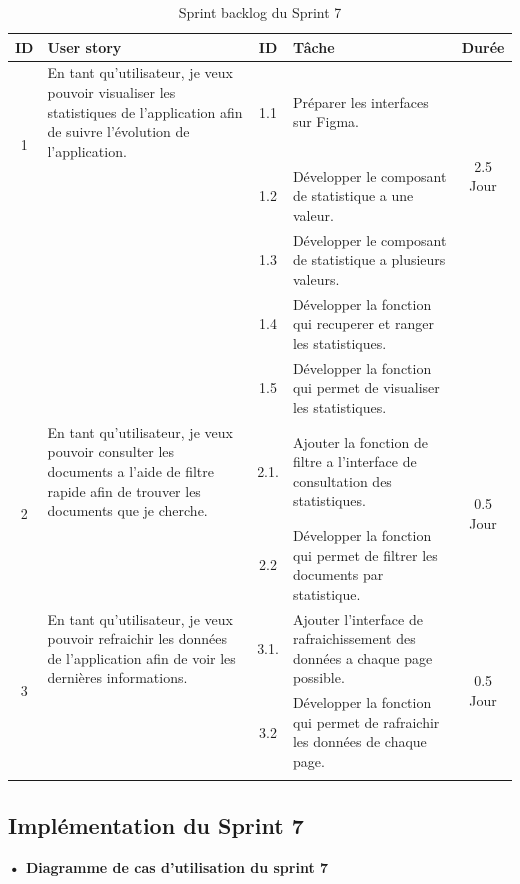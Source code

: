 \begin{adjustwidth}{-1cm}{}
    
    \begin{longtable}{|c|p{6cm}|c|p{6cm}|c|}
      \hline
      \textbf{ID} & \textbf{User story} & \textbf{ID}  & \textbf{Tâche} & \textbf{Durée} \\
      \hline
      \multirow{2}{*}{1} & En tant qu'utilisateur, je veux pouvoir visualiser les statistiques de l'application afin de suivre l'évolution de l'application.
      & 1.1 & Préparer les interfaces sur Figma. & \multirow{3}{*}{2.5 Jour} \\
      \cline{3-4}
      & & 1.2 & Développer le composant de statistique a une valeur. & \\
      \cline{3-4}
      & & 1.3 & Développer le composant de statistique a plusieurs valeurs. & \\
      \cline{3-4}
      & & 1.4 & Développer la fonction qui recuperer et ranger les statistiques. & \\
      & & 1.5 & Développer la fonction qui permet de visualiser les statistiques. & \\
      \cline{1-5}
      \multirow{2}{*}{2} & En tant qu'utilisateur, je veux pouvoir consulter les documents a l'aide de filtre rapide afin de trouver les documents que je cherche. & 2.1.& Ajouter la fonction de filtre a l'interface de consultation des statistiques. & \multirow{2}{*}{0.5 Jour} \\
      \cline{3-4}
      & & 2.2 & Développer la fonction qui permet de filtrer les documents par statistique. & \\
      \cline{1-5}
      \multirow{2}{*}{3} & En tant qu'utilisateur, je veux pouvoir refraichir les données de l'application afin de voir les dernières informations. & 3.1.& Ajouter l'interface de rafraichissement des données a chaque page possible. & \multirow{2}{*}{0.5 Jour} \\
      \cline{3-4}
      & & 3.2 & Développer la fonction qui permet de rafraichir les données de chaque page. & \\
      \cline{1-5}
  \hline
  \caption{Sprint backlog du Sprint 7}
  \label{tab:sprint-backlog-7}
\end{longtable}
\end{adjustwidth}


\subsection{Implémentation du Sprint 7}
\textbf{•	Diagramme de cas d'utilisation du sprint 7}

